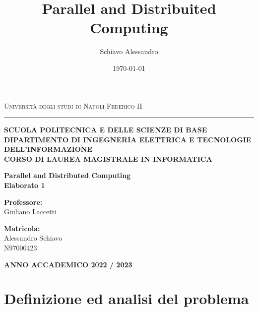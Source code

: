 \documentclass[a4paper,11pt]{book}
\title{Parallel and Distribuited Computing}
\author{Schiavo Alessandro}
\date{\today}
\begin{document}
\begin{titlepage}
    \begin{center}
        {{\Large
        {\textsc{Università degli studi di Napoli Federico II}}}} 
        \rule[0.1cm]{15.8cm}{0.1mm}
        {\small{\bf SCUOLA POLITECNICA E DELLE SCIENZE DI BASE\\  \vspace{3mm}
        DIPARTIMENTO DI INGEGNERIA ELETTRICA E TECNOLOGIE
DELL’INFORMAZIONE \\  \vspace{3mm}
CORSO DI LAUREA MAGISTRALE IN INFORMATICA}}
    \end{center}
    \vspace{15mm}
    \begin{center}
        {\LARGE{\bf Parallel and Distributed Computing }}\\
        \vspace{3mm}
        {\LARGE{\bf Elaborato 1}}\\
    \end{center}
    \vspace{40mm}
    \par
    \noindent
    \begin{minipage}[t]{0.47\textwidth}
        {\large{\bf Professore:}\\Giuliano Laccetti}
    \end{minipage}
    \hfill
    \begin{minipage}[t]{0.47\textwidth}
        \raggedleft
        {\large{\bf Matricola:}\\ Alessandro Schiavo \\N97000423}
    \end{minipage}
    \vspace{20mm}
    \begin{center}
        {\large{\bf ANNO ACCADEMICO 2022 / 2023 }}
    \end{center}
\end{titlepage}

\tableofcontents

\chapter{Definizione ed analisi del problema}
\end{document}
